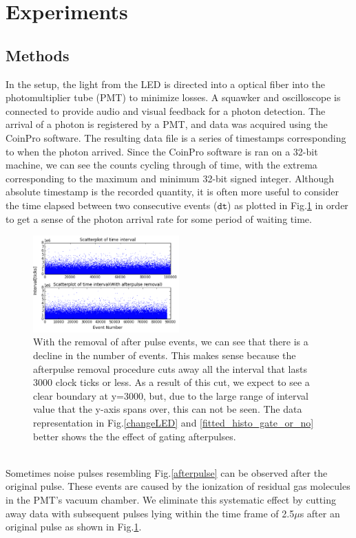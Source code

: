 \documentclass[authoryear, 12pt,5p, times]{elsarticle}
\begin{document}
\section{Experiments\label{experiment}}
	\subsection{Methods}
\indent In the setup, the light from the LED is directed into a optical fiber into the photomultiplier tube (PMT) to minimize losses. A squawker and oscilloscope is connected to provide audio and visual feedback for a photon detection. The arrival of a photon is registered by a PMT, and data was acquired using the CoinPro software. The resulting data file is a series of timestamps corresponding to when the photon arrived. Since the CoinPro software is ran on a 32-bit machine, we can see the counts cycling through of time, with the extrema corresponding to the maximum and minimum 32-bit signed integer. Although absolute timestamp is the recorded quantity, it is often more useful to consider the time elapsed between two consecutive events ($\texttt{dt}$) as plotted in Fig.\ref{scatterplot} in order to get a sense of  the photon arrival rate for some period of waiting time.
\begin{figure}[h]
\centering
\includegraphics[width=0.5\textwidth]{figures/interval_scatterplot_subplot}
\caption{With the removal of after pulse events, we can see that there is a decline in the number of events. This makes sense because the afterpulse removal procedure cuts away all the interval that lasts 3000 clock ticks or less. As a result of this cut, we expect to see a clear boundary at y=3000, but, due to the large range of interval value that the y-axis spans over, this can not be seen. The data representation in Fig.\ref{changeLED} and \ref{fitted_histo_gate_or_no} better shows the the effect of gating afterpulses. }
\label{scatterplot}
\end{figure}
\\
\indent Sometimes noise pulses resembling Fig.\ref{afterpulse} can be observed after the original pulse. These events are caused by  the ionization of residual gas molecules in the PMT's vacuum chamber.  We eliminate this systematic effect by cutting away data with subsequent pulses lying within the time frame of 2.5$\mu$s  after an original pulse as shown in Fig.\ref{scatterplot}.
\end{document}

